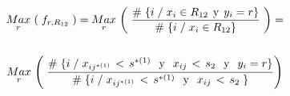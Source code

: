 \documentclass[
  11pt,
  a4paper,
]{article}
\begin{document}
\begin{gather*}
\underset{  r}{ Max} \hspace{0.05 cm} \left(\hspace{0.1 cm} f_{r, R_{12}} \hspace{0.1 cm}\right) = \underset{ r}{ Max} \hspace{0.05 cm} \left(\hspace{0.1 cm}   \dfrac{\# \hspace{0.1 cm}\lbrace i \hspace{0.1 cm}/\hspace{0.1 cm} x_i \in R_{12} \hspace{0.15 cm}\text{y}\hspace{0.15 cm} y_i = r \rbrace}{\# \hspace{0.1 cm}\lbrace i \hspace{0.1 cm}/\hspace{0.1 cm} x_i \in R_{12}  \rbrace}  \hspace{0.1 cm}\right) = \\ \\ \underset{  r}{ Max} \hspace{0.05 cm} \left(\hspace{0.1 cm}   \dfrac{\# \hspace{0.1 cm}\lbrace i \hspace{0.1 cm}/\hspace{0.1 cm}  x_{ij^{*(1)}} \hspace{0.05cm}   < \hspace{0.05cm} s^{*(1)} \hspace{0.25 cm}\text{y}\hspace{0.25 cm} x_{ij} \hspace{0.05cm}   < \hspace{0.05cm} s_2 \hspace{0.25 cm}\text{y}\hspace{0.25 cm} y_i = r \rbrace}{\# \hspace{0.1 cm}\lbrace i \hspace{0.1 cm} / \hspace{0.1 cm}  x_{ij^{*(1)}} \hspace{0.05cm}   < \hspace{0.05cm} s^{*(1)} \hspace{0.25 cm}\text{y}\hspace{0.25 cm} x_{ij} \hspace{0.05cm}   < \hspace{0.05cm} s_2  \hspace{0.1 cm} \rbrace }\right)
\end{gather*}
\end{document}
